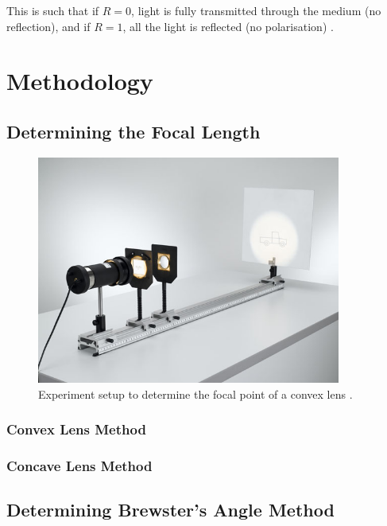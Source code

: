 \documentclass[12pt]{article}
\begin{document}
\vspace{.5cm}

This is such that if $R=0$, light is fully transmitted through the medium (no reflection), and if $R=1$, all the light is reflected (no polarisation)
\cite{UCDlens}.

\section{Methodology} \label{sec:2}

\subsection{Determining the Focal Length} \label{sec:2.1}

\begin{figure}[H]
    \centering
    \includegraphics[width=10cm]{lens exp setup.jpg}
    \caption{\centering Experiment setup to determine the focal point of a convex lens \protect\cite{leyboldexp}.}
    \label{fig:lensexp}
\end{figure}

\subsubsection{Convex Lens Method} \label{sec:2.1.1}



\subsubsection{Concave Lens Method} \label{sec:2.1.2}



\subsection{Determining Brewster's Angle Method} \label{sec:2.2}
\end{document}
